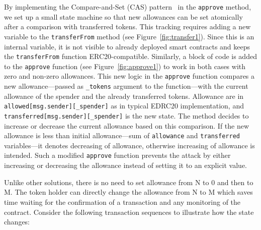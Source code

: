 By implementing the Compare-and-Set (CAS) pattern~\cite{Ref06} in the \texttt{approve} method, we set up a small state machine so that new allowances can be set atomically after a comparison with transferred tokens. This tracking requires adding a new variable to the \texttt{transferFrom} method (see Figure~\ref{fig:transfer1}). Since this is an internal variable, it is not visible to already deployed smart contracts and keeps the \texttt{transferFrom} function ERC20-compatible. Similarly, a block of code is added to the \texttt{approve} function (see Figure~\ref{fig:approve1}) to work in both cases with zero and non-zero allowances. This new logic in the \texttt{approve} function compares a new allowance---passed as \texttt{\_tokens} argument to the function---with the current allowance of the spender and the already transferred tokens. Allowance are in \texttt{allowed[msg.sender][\_spender]} as in typical EDRC20 implementation, and \texttt{transferred[msg.sender][\_spender]} is the new state. The method decides to increase or decrease the current allowance based on this comparison. If the new allowance is less than initial allowance---sum of \texttt{allowance} and \texttt{transferred} variables---it denotes decreasing of allowance, otherwise increasing of allowance is intended. Such a modified \texttt{approve} function prevents the attack by either increasing or decreasing the allowance instead of setting it to an explicit value.

Unlike other solutions, there is no need to set allowance from N to 0 and then to M. The token holder can directly change the allowance from N to M which saves time waiting for the confirmation of a transaction and any monitoring of the contract. Consider the following transaction sequences to illustrate how the state changes:


